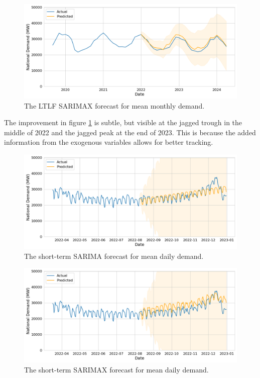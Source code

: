\documentclass[12pt]{scrreprt}
\begin{document}
\begin{figure}[h!]
    \centering
    \includegraphics[scale=0.5]{Images/ltex_fcast.png}
    \caption{The LTLF SARIMAX forecast for mean monthly demand.}
    \label{fig:ltex_fcast}
\end{figure}

The improvement in figure \ref{fig:ltex_fcast} is subtle, but visible at the jagged trough in the middle of 2022 and the jagged peak at the end of 2023. This is because the added information from the exogenous variables allows for better tracking.

\begin{figure}[h!]
    \centering
    \includegraphics[scale=0.5]{Images/stts_fcast.png}
    \caption{The short-term SARIMA forecast for mean daily demand.}
    \label{fig:stts_fcast}
\end{figure}

\begin{figure}[h!]
    \centering
    \includegraphics[scale=0.5]{Images/stex_fcast.png}
    \caption{The short-term SARIMAX forecast for mean daily demand.}
    \label{fig:stex_fcast}
\end{figure}
\end{document}
